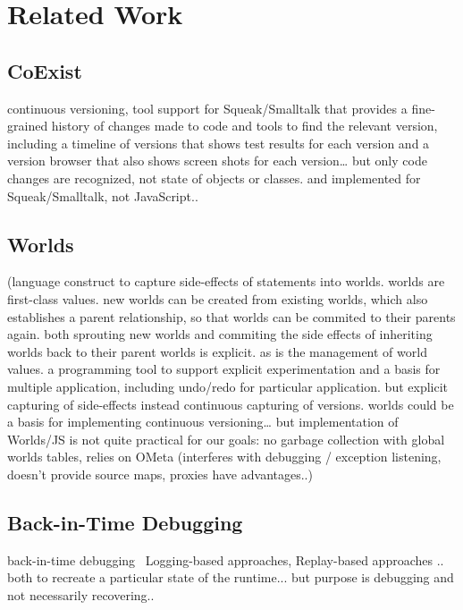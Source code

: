 \chapter{Related Work} \label{sec:RELATED_WORK}

\section{CoExist}

\cite{Steinert2012COE}
continuous versioning, tool support for Squeak/Smalltalk that provides a fine-grained history of changes made to code and tools to find the relevant version, including a timeline of versions that shows test results for each version and a version browser that also shows screen shots for each version… but only code changes are recognized, not state of objects or classes. and implemented for Squeak/Smalltalk, not JavaScript..


\section{Worlds}

(language construct to capture side-effects of statements into worlds. worlds are first-class values. new worlds can be created from existing worlds, which also establishes a parent relationship, so that worlds can be commited to their parents again. both sprouting new worlds and commiting the side effects of inheriting worlds back to their parent worlds is explicit. as is the management of world values. a programming tool to support explicit experimentation and a basis for multiple application, including undo/redo for particular application. but explicit capturing of side-effects instead continuous capturing of versions. 
worlds could be a basis for implementing continuous versioning… but implementation of Worlds/JS is not quite practical for our goals: no garbage collection with global worlds tables, relies on OMeta (interferes with debugging / exception listening, doesn’t provide source maps, proxies have advantages..)


\section{Back-in-Time Debugging}

back-in-time debugging~\cite{Lewis2003BIT}
Logging-based approaches, Replay-based approaches .. both to recreate a particular state of the runtime... but purpose is debugging and not necessarily recovering.. 

